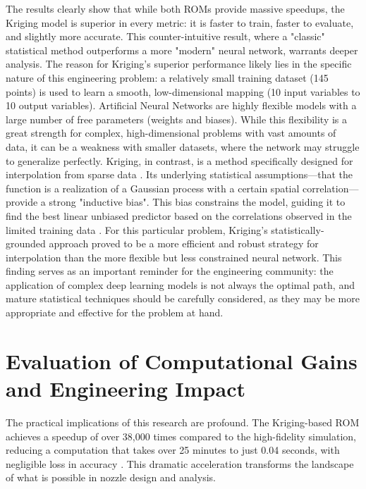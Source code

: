 \documentclass[tg, EN]{ufabcFHZh_tg}
\begin{document}
The results clearly show that while both ROMs provide massive speedups, the Kriging model is superior in every metric: it is faster to train, faster to evaluate, and slightly more accurate. This counter-intuitive result, where a "classic" statistical method outperforms a more "modern" neural network, warrants deeper analysis. The reason for Kriging's superior performance likely lies in the specific nature of this engineering problem: a relatively small training dataset (145 points) is used to learn a smooth, low-dimensional mapping (10 input variables to 10 output variables). Artificial Neural Networks are highly flexible models with a large number of free parameters (weights and biases). While this flexibility is a great strength for complex, high-dimensional problems with vast amounts of data, it can be a weakness with smaller datasets, where the network may struggle to generalize perfectly. Kriging, in contrast, is a method specifically designed for interpolation from sparse data \citep{jones1998, ng2018}. Its underlying statistical assumptions—that the function is a realization of a Gaussian process with a certain spatial correlation—provide a strong "inductive bias". This bias constrains the model, guiding it to find the best linear unbiased predictor based on the correlations observed in the limited training data \citep{rasmussen2006, sacks1989}. For this particular problem, Kriging's statistically-grounded approach proved to be a more efficient and robust strategy for interpolation than the more flexible but less constrained neural network. This finding serves as an important reminder for the engineering community: the application of complex deep learning models is not always the optimal path, and mature statistical techniques should be carefully considered, as they may be more appropriate and effective for the problem at hand.

\section{Evaluation of Computational Gains and Engineering Impact}

The practical implications of this research are profound. The Kriging-based ROM achieves a speedup of over 38,000 times compared to the high-fidelity simulation, reducing a computation that takes over 25 minutes to just 0.04 seconds, with negligible loss in accuracy \citep{moreira2023}. This dramatic acceleration transforms the landscape of what is possible in nozzle design and analysis.
\end{document}
